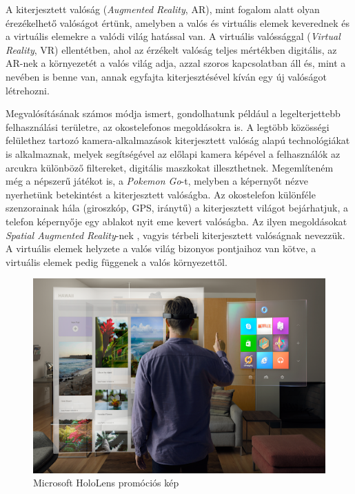 


A kiterjesztett valóság (\textit{Augmented Reality}, AR), mint fogalom alatt olyan érezékelhető valóságot értünk, amelyben a valós és virtuális elemek keverednek és a virtuális elemekre a valódi világ hatással van. A virtuális valóssággal (\textit{Virtual Reality}, VR) ellentétben, ahol az érzékelt valóság teljes mértékben digitális, az AR-nek a környezetét a valós világ adja, azzal szoros kapcsolatban áll és, mint a nevében is benne van, annak egyfajta kiterjesztésével kíván egy új valóságot létrehozni.

Megvalósításának számos módja ismert, gondolhatunk például a legelterjettebb felhasználási területre, az okostelefonos megoldásokra is. A legtöbb közösségi felülethez tartozó kamera-alkalmazások kiterjesztett valóság alapú technológiákat is alkalmaznak, melyek segítségével az előlapi kamera képével a felhasználók az arcukra különböző filtereket, digitális maszkokat illeszthetnek. Megemlíteném még a népszerű játékot is, a \textit{Pokemon Go}-t, melyben a képernyőt nézve nyerhetünk betekintést a kiterjesztett valóságba. Az okostelefon különféle szenzorainak hála (giroszkóp, GPS, iránytű) a kiterjesztett világot bejárhatjuk, a telefon képernyője egy ablakot nyit eme kevert valóságba. Az ilyen megoldásokat \textit{Spatial Augmented Reality}-nek \cite{bimber2005spatial}, vagyis térbeli kiterjesztett valóságnak nevezzük. A virtuális elemek helyzete a valós világ bizonyos pontjaihoz van kötve, a virtuális elemek pedig függenek a valós környezettől.

\begin{figure}[h]
\centering
\includegraphics[width=10.3truecm, height=6.28truecm]{images/AR-hololens.png}
\caption{Microsoft HoloLens promóciós kép}
\label{fig:hololens}
\end{figure}

